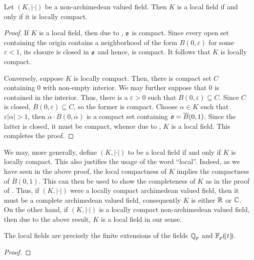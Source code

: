 \begin{corollary}
    Let $(K, |\cdot|)$ be a non-archimedean valued field. Then $K$ is a local field if and only if it is locally compact.
\end{corollary}
\begin{proof}
    If $K$ is a local field, then due to , $\mathfrak{o}$ is compact. Since every open set containing the origin contains a neighborhood of the form $B(0, \varepsilon)$ for some $\varepsilon < 1$, its closure is closed in $\mathfrak{o}$ and hence, is compact. It follows that $K$ is locally compact. 

    Conversely, suppose $K$ is locally compact. Then, there is compact set $C$ containing $0$ with non-empty interior. We may further suppose that $0$ is contained in the interior. Thus, there is a $\varepsilon > 0$ such that $B(0,\varepsilon)\subseteq C$. Since $C$ is closed, $\overline B(0,\varepsilon)\subseteq C$, so the former is compact. Choose $\alpha\in K$ such that $\varepsilon |\alpha| > 1$, then $\alpha\cdot\overline B(0,\alpha)$ is a compact set containing $\mathfrak{o} = \overline B(0, 1)$. Since the latter is closed, it must be compact, whence due to , $K$ is a local field. This completes the proof.
\end{proof}

\begin{remark}
    We may, more generally, define $(K, |\cdot|)$ to be a local field if and only if $K$ is locally compact. This also justifies the usage of the word ``local''. Indeed, as we have seen in the above proof, the local compactness of $K$ implies the compactness of $\overline B(0, 1)$. This can then be used to show the completeness of $K$ as in the proof of . Thus, if $(K, |\cdot|)$ were a locally compact archimedean valued field, then it must be a complete archimedean valued field, consequently $K$ is either $\mathbb{R}$ or $\mathbb{C}$. On the other hand, if $(K, |\cdot|)$ is a locally compact non-archimedean valued field, then due to the above result, $K$ is a local field in our sense.
\end{remark}

\begin{theorem}
    The local fields are precisely the finite extensions of the fields $\mathbb{Q}_p$ and $\mathbb{F}_p(\!(t)\!)$.
\end{theorem}
\begin{proof}
    
\end{proof}